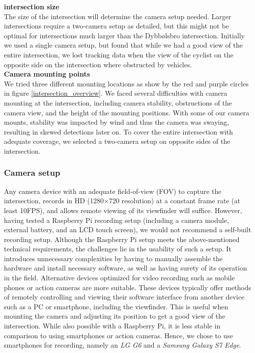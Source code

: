 \textbf{intersection size} \\
The size of the intersection will determine the camera setup needed. Larger intersections require a two-camera setup as detailed, 
but this might not be optimal for intersections much larger than the Dybbølsbro intersection. 
Initially we used a single camera setup, but found that while we had a good view of the entire intersection, 
we lost tracking data when the view of the cyclist on the opposite side on the intersection where obstructed by vehicles.
\ \\

\textbf{Camera mounting points} \\
We tried three different mounting locations as show by the red and purple circles in figure \ref{intersection_overview}. 
We faced several difficulties with camera mounting at the intersection, including camera stability, 
obstructions of the camera view, and the height of the mounting positions. 
With some of our camera mounts, stability was impacted by wind and thus the camera was swaying, resulting in skewed detections later on.
To cover the entire intersection with adequate coverage, we selected a two-camera setup on opposite sides of the intersection.

\subsubsection{Camera setup}
Any camera device with an adequate field-of-view (FOV) to capture the intersection, records in HD (1280×720 resolution) at a constant 
frame rate (at least 10FPS), and allows remote viewing of its viewfinder will suffice. 
However, having tested a Raspberry Pi recording setup (including a camera module, external battery, and an LCD touch screen), 
we would not recommend a self-built recording setup. Although the Raspberry Pi setup meets the above-mentioned technical requirements, 
the challenges lie in the usability of such a setup. 
It introduces unnecessary complexities by having to manually assemble the hardware and install necessary software, as well as 
having surety of its operation in the field.
Alternative devices optimized for video recording such as mobile phones or action cameras are more suitable.
These devices typically offer methods of remotely controlling and viewing their software interface from 
another device such as a PC or smartphone, including the viewfinder. 
This is useful when mounting the camera and adjusting its position to get a good view of the intersection. 
While also possible with a Raspberry Pi, it is less stable in comparison to using smartphones or action cameras.
Hence, we chose to use smartphones for recording, namely an \textit{LG G6} and a \textit{Samsung Galaxy S7 Edge}.


